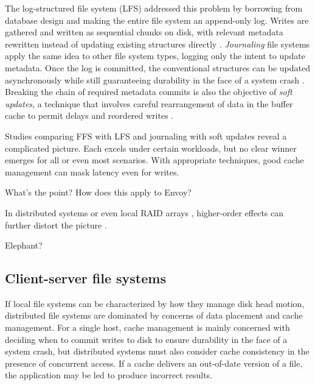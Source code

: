 The log-structured file system (LFS) addressed this problem by borrowing from database design and making the entire file system an append-only log. Writes are gathered and written as sequential chunks on disk, with relevant metadata rewritten instead of updating existing structures directly \cite{rosenblum}. \emph{Journaling} file systems apply the same idea to other file system types, logging only the intent to update metadata. Once the log is committed, the conventional structures can be updated asynchronously while still guaranteeing durability in the face of a system crash \cite{hagmann,sweeney,tweedie}. Breaking the chain of required metadata commits is also the objective of \emph{soft updates}, a technique that involves careful rearrangement of data in the buffer cache to permit delays and reordered writes \cite{ganger94}.

Studies comparing FFS with LFS \cite{seltzer95} and journaling with soft updates \cite{seltzer00} reveal a complicated picture. Each excels under certain workloads, but no clear winner emerges for all or even most scenarios. With appropriate techniques, good cache management can mask latency even for writes.


What's the point?  How does this apply to Envoy?

In distributed systems or even local RAID arrays \cite{patterson}, higher-order effects can further distort the picture \cite{stein05}.

Elephant? \cite{santry}

\subsection{Client-server file systems}

If local file systems can be characterized by how they manage disk head motion, distributed file systems are dominated by concerns of data placement and cache management. For a single host, cache management is mainly concerned with deciding when to commit writes to disk to ensure durability in the face of a system crash, but distributed systems must also consider cache consistency in the presence of concurrent access. If a cache delivers an out-of-date version of a file, the application may be led to produce incorrect results.

